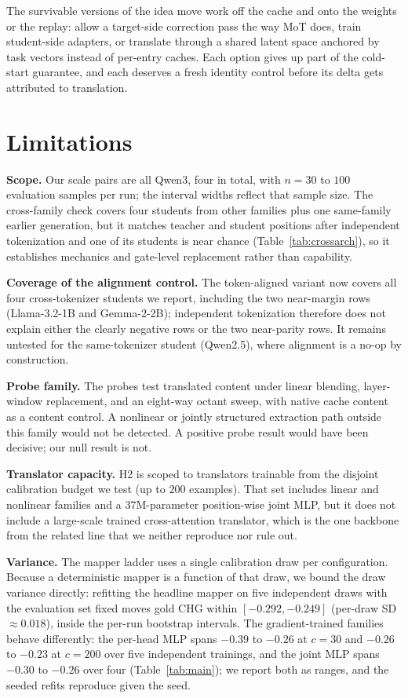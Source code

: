 \documentclass[10pt]{article}
\begin{document}
The survivable versions of the idea move work off the cache and onto the
weights or the replay: allow a target-side correction pass the way MoT does,
train student-side adapters, or translate through a shared latent space
anchored by task vectors instead of per-entry caches. Each option gives up
part of the cold-start guarantee, and each deserves a fresh identity control
before its delta gets attributed to translation.

\section{Limitations}
\label{sec:limitations}
\textbf{Scope.} Our scale pairs are all Qwen3, four in total, with $n{=}30$ to
$100$ evaluation samples per run; the interval widths reflect that sample size.
The cross-family check covers four students from other families plus one
same-family earlier generation, but it matches teacher and student positions
after independent tokenization and one of its students is near chance
(Table~\ref{tab:crossarch}), so it establishes mechanics and gate-level
replacement rather than capability.

\textbf{Coverage of the alignment control.} The token-aligned variant now covers
all four cross-tokenizer students we report, including the two near-margin rows
(Llama-3.2-1B and Gemma-2-2B); independent tokenization therefore does not
explain either the clearly negative rows or the two near-parity rows. It remains
untested for the same-tokenizer student (Qwen2.5), where alignment is a no-op by
construction.

\textbf{Probe family.} The probes test translated content under linear
blending, layer-window replacement, and an eight-way octant sweep, with native
cache content as a content control. A nonlinear or jointly structured
extraction path outside this family would not be detected. A positive probe
result would have been decisive; our null result is not.

\textbf{Translator capacity.} H2 is scoped to translators trainable from the
disjoint calibration budget we test (up to $200$ examples). That set includes
linear and nonlinear families and a $37$M-parameter position-wise joint MLP,
but it does not
include a large-scale trained cross-attention translator, which is the one
backbone from the related line that we neither reproduce nor rule out.

\textbf{Variance.} The mapper ladder uses a single calibration draw per
configuration. Because a deterministic mapper is a function of that draw, we
bound the draw variance directly: refitting the headline mapper on five
independent draws with the evaluation set fixed moves gold CHG within
$[-0.292, -0.249]$ (per-draw SD $\approx 0.018$), inside the per-run bootstrap
intervals. The gradient-trained families behave differently: the per-head MLP
spans $-0.39$ to $-0.26$ at $c{=}30$ and $-0.26$ to $-0.23$ at $c{=}200$ over
five independent trainings, and the joint MLP spans $-0.30$ to $-0.26$ over
four (Table~\ref{tab:main}); we report both as ranges, and the seeded refits
reproduce given the seed.
\end{document}
